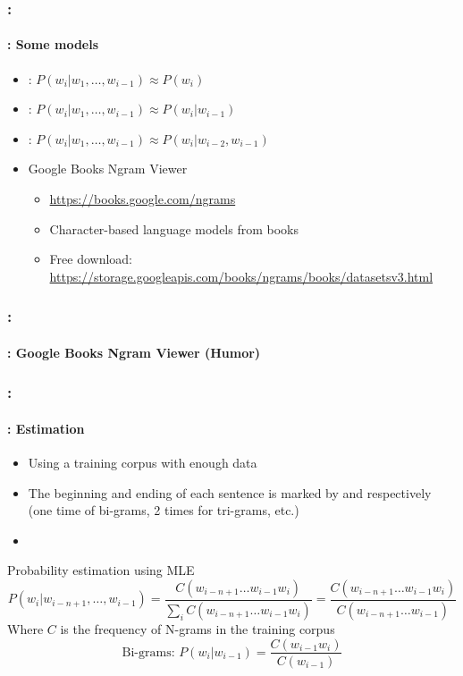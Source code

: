\documentclass[xcolor=table]{beamer}
\begin{document}
\begin{frame}
	\frametitle{\insertshortsubtitle: \insertsection}
	\framesubtitle{\insertsubsection: Some models}

	\begin{itemize}
		\item {}: $P(w_i | w_1,\ldots, w_{i-1}) \approx P(w_i)$
		\item {}: $P(w_i | w_1,\ldots, w_{i-1}) \approx P(w_i | w_{i-1})$
		\item {}:  $P(w_i | w_1,\ldots, w_{i-1}) \approx P(w_i | w_{i-2}, w_{i-1})$
		\item Google Books Ngram Viewer
		\begin{itemize}
			\item \url{https://books.google.com/ngrams}
			\item Character-based language models from books 
			\item Free download: \url{https://storage.googleapis.com/books/ngrams/books/datasetsv3.html}
		\end{itemize}
	\end{itemize}

\end{frame}

\begin{frame}
	\frametitle{\insertshortsubtitle: \insertsection}
	\framesubtitle{\insertsubsection: Google Books Ngram Viewer (Humor)}

	\begin{center}
	\end{center}

\end{frame}

\begin{frame}
	\frametitle{\insertshortsubtitle: \insertsection}
	\framesubtitle{\insertsubsection: Estimation}

	\begin{itemize}
		\item Using a training corpus with enough data
		\item The beginning and ending of each sentence is marked by  and  respectively (one time of bi-grams, 2 times for tri-grams, etc.)
		\item {}
	\end{itemize}
	
	\begin{block}{Probability estimation using MLE}
		{\small \[%
		P(w_i | w_{i-n+1},\ldots, w_{i-1}) = \frac{C(w_{i-n+1} \ldots w_{i-1} w_i)}{\sum_i C(w_{i-n+1} \ldots w_{i-1} w_i)}
		= \frac{C(w_{i-n+1} \ldots w_{i-1} w_i)}{C(w_{i-n+1} \ldots w_{i-1})}
		\]}
		Where $C$ is the frequency of N-grams in the training corpus
		\[%
		\text{Bi-grams: } P(w_i | w_{i-1}) = \frac{C(w_{i-1} w_i)}{C(w_{i-1})}
		\]
	\end{block}

\end{frame}
\end{document}

